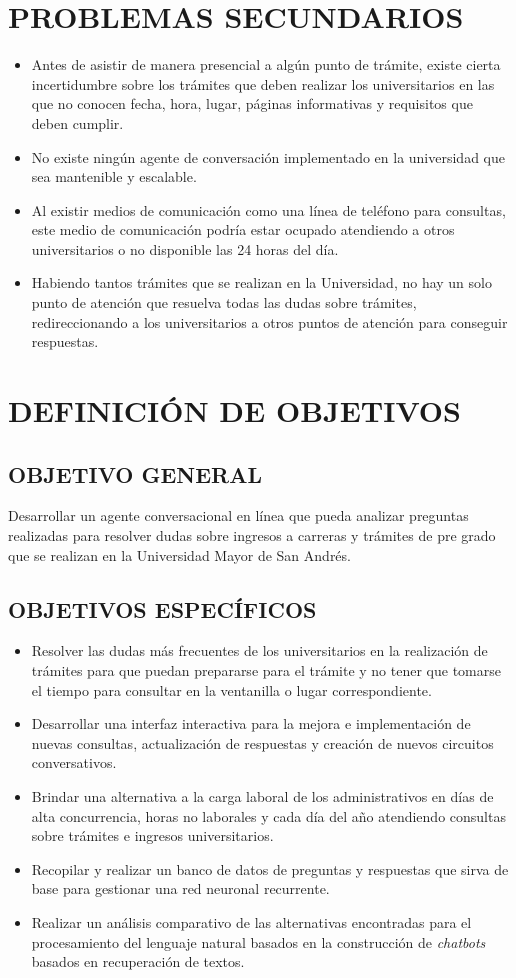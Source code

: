 \documentclass[letter, openright, 12pt]{book}
\begin{document}
\section{PROBLEMAS SECUNDARIOS}
\begin{itemize}
\item Antes de asistir de manera presencial a algún punto de trámite, existe cierta incertidumbre sobre los trámites que deben realizar los universitarios en las que no conocen fecha, hora, lugar, páginas informativas y requisitos que deben cumplir.
\item No existe ningún agente de conversación implementado en la universidad que sea mantenible y escalable.
\item Al existir medios de comunicación como una línea de teléfono para consultas, este medio de comunicación podría estar ocupado atendiendo a otros universitarios o no disponible las 24 horas del día.
\item Habiendo tantos trámites que se realizan en la Universidad, no hay un solo punto de atención que resuelva todas las dudas sobre trámites, redireccionando a los universitarios a otros puntos de atención para conseguir respuestas.
\end{itemize}
\section{DEFINICIÓN DE OBJETIVOS}
\subsection{OBJETIVO GENERAL}
Desarrollar un agente conversacional en línea que pueda analizar preguntas realizadas para resolver dudas sobre ingresos a carreras y trámites de pre grado que se realizan en la Universidad Mayor de San Andrés.

\subsection{OBJETIVOS ESPECÍFICOS}
\begin{itemize}
\item Resolver las dudas más frecuentes de los universitarios en la realización de trámites para que puedan prepararse para el trámite y no tener que tomarse el tiempo para consultar en la ventanilla o lugar correspondiente.
\item Desarrollar una interfaz interactiva para la mejora e implementación de nuevas consultas, actualización de respuestas y creación de nuevos circuitos conversativos.
\item Brindar una alternativa a la carga laboral de los administrativos en días de alta concurrencia, horas no laborales y cada día del año atendiendo consultas sobre trámites e ingresos universitarios.
\item Recopilar y realizar un banco de datos de preguntas y respuestas que sirva de base para gestionar una red neuronal recurrente. 
\item Realizar un análisis comparativo de las alternativas encontradas para el procesamiento del lenguaje natural basados en la construcción de \textit{chatbots} basados en recuperación de textos. 
\end{itemize}
\end{document}
